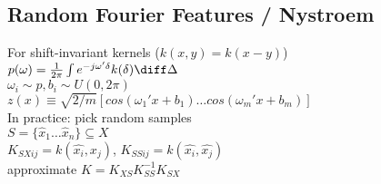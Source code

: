 \subsection{Random Fourier Features / Nystroem}
For shift-invariant kernels ($k(x, y) = k(x -y)$) \\
$p(\omega)=\frac{1}{2\pi}\int e^{-j\omega'\delta}k(\delta) \diff\Delta$ \\
$\omega_i \sim p, b_i \sim U(0, 2\pi) $\\
$z(x) \equiv \sqrt{2/m}[cos(\omega_1'x+b_1) \dots cos(\omega_m'x+b_m)]$ \\
In practice: pick random samples\\
$S = \{\hat{x}_1 \dots \hat{x}_n\} \subseteq X$ \\
$K_{SXij} = k(\hat{x_i}, x_j)$, $K_{SSij} = k(\hat{x_i}, \hat{x_j})$ \\
approximate $K = K_{XS}K_{SS}^{-1}K_{SX}$